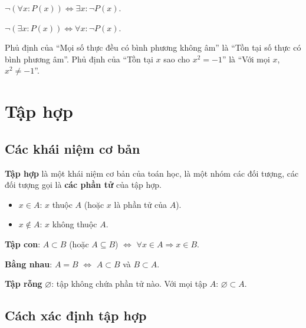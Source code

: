 \documentclass[12pt,a4paper]{article}
\begin{document}
\begin{congthuc}[title={Phủ định}]
  $\neg(\forall x: P(x)) \Leftrightarrow \exists x: \neg P(x)$.
  
  $\neg(\exists x: P(x)) \Leftrightarrow \forall x: \neg P(x)$.
\end{congthuc}

\begin{vidu}
  Phủ định của ``Mọi số thực đều có bình phương không âm'' là ``Tồn tại số thực có bình phương âm''. Phủ định của ``Tồn tại $x$ sao cho $x^2 = -1$'' là ``Với mọi $x$, $x^2 \ne -1$''.
\end{vidu}

\section{Tập hợp}

\subsection{Các khái niệm cơ bản}

\begin{dinhnghia}
  \textbf{Tập hợp} là một khái niệm cơ bản của toán học, là một nhóm các đối tượng, các đối tượng gọi là \textbf{các phần tử} của tập hợp.
  \begin{itemize}
    \item $x \in A$: $x$ thuộc $A$ (hoặc $x$ là phần tử của $A$).
    \item $x \notin A$: $x$ không thuộc $A$.
  \end{itemize}
\end{dinhnghia}

\begin{dinhnghia}
  \textbf{Tập con}: $A \subset B$ (hoặc $A \subseteq B$) $\Leftrightarrow$ $\forall x \in A \Rightarrow x \in B$.
  
  \textbf{Bằng nhau}: $A = B$ $\Leftrightarrow$ $A \subset B$ và $B \subset A$.
\end{dinhnghia}

\begin{dinhnghia}
  \textbf{Tập rỗng} $\varnothing$: tập không chứa phần tử nào. Với mọi tập $A$: $\varnothing \subset A$.
\end{dinhnghia}

\subsection{Cách xác định tập hợp}
\end{document}
